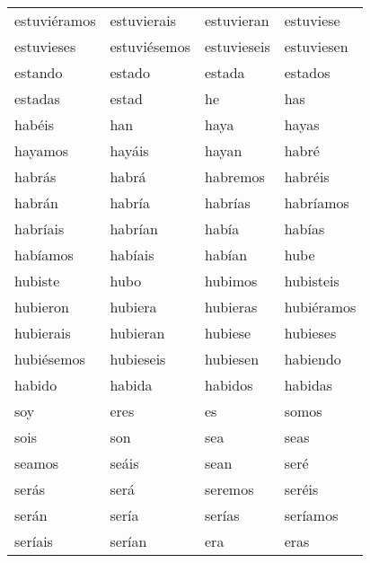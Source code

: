 	\begin{table}
	\begin{tabular}{l l l l}
	
 estuvi\'eramos &
	 estuvierais &
	 estuvieran &
	 estuviese \\
	 estuvieses &
	 estuvi\'esemos &
	 estuvieseis &
	 estuviesen \\
	 estando &
	 estado &
	 estada &
	 estados \\
	 estadas &
	 estad &
	 he & 
	 has  \\
	 hab\'eis &
 	 han &
	 haya &
	 hayas \\
	 hayamos &
	 hay\'ais &
	 hayan &
	 habr\'e \\
 	 habr\'as &
	 habr\'a &
	 habremos & 
	 habr\'eis \\
	 habr\'an &
	 habr\'ia &
	 habr\'ias &
	 habr\'iamos \\
	 habr\'iais &
	 habr\'ian &
	 hab\'ia &
	 hab\'ias \\
	 hab\'iamos &
	 hab\'iais &
	 hab\'ian &
	 hube \\
	 hubiste &
	 hubo &
	 hubimos &
	 hubisteis \\
	 hubieron &
	 hubiera &
	 hubieras &
	 hubi\'eramos \\
	 hubierais &
	 hubieran &
	 hubiese &
	 hubieses \\
	 hubi\'esemos &
	 hubieseis &
	 hubiesen &
	 habiendo \\
	 habido &
	 habida &
	 habidos &
	 habidas \\    
	 soy &
	 eres &
	 es &
	 somos \\
	 sois &
	 son &
	 sea &
	 seas \\
	 seamos &
	 se\'ais &
	 sean &
	 ser\'e \\
	 ser\'as &
	 ser\'a &
	 seremos &
	 ser\'eis \\
	 ser\'an &
	 ser\'ia &
	 ser\'ias &
	 ser\'iamos \\
	 ser\'iais &
	 ser\'ian &
	 era &
	 eras \\	
	

\end{tabular}
\end{table}
